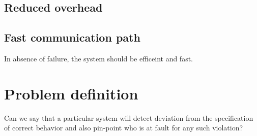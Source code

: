 \subsection{Reduced overhead} 
 
\subsection{Fast communication path} In absence of failure, the system should be efficeint and fast. 
 
 
\fi 
 
\section{Problem definition} 
Can we say that a particular system will detect 
deviation from the specification of correct behavior and also 
pin-point who is at fault for any such violation?  
 
